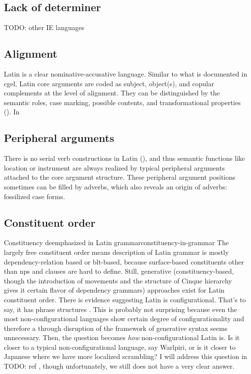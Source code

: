 \documentclass[a4paper, oneside]{report}
\begin{document}
\subsection{Lack of determiner}

TODO: other IE languages

\subsection{Alignment}

Latin is a clear nominative-accusative language.
Similar to what is documented in \acs{cgel},
Latin core arguments are coded as subject, object(s),
and copular complements at the level of alignment.
They can be distinguished by the semantic roles,
case marking, possible contents, and transformational properties 
().
In 

\subsection{Peripheral arguments}

There is no serial verb constructions in Latin (),
and thus semantic functions like location or instrument 
are always realized by typical peripheral arguments
attached to the core argument structure.
These peripheral argument positions sometimes can be filled by adverbs,
which also reveals an origin of adverbs: fossilized case forms.

\subsection{Constituent order}\label{sec:constituent-order-abs}

\begin{theorybox}{Constituency deemphasized in Latin grammar}{constituency-in-grammar}
    The largely free constituent order 
    means description of Latin grammar is mostly dependency-relation based or \acs{blt}-based,
    because surface-based constituents other than \acs{np}s and clauses are hard to define.
    Still, generative (constituency-based, 
    though the introduction of movements and the structure of Cinque hierarchy
    gives it certain flavor of dependency grammars) approaches exist for Latin constituent order.
    There is evidence suggesting Latin is configurational.
    That's to say, it has phrase structures \citep{danckaert2017development}.
    This is probably not surprising because
    even the most non-configurational languages show certain degree of configurationality 
    \citep[among others]{niedzielski2017clausal,morris2018evidence,legate2002warlpiri}
    and therefore a through disruption 
    of the framework of generative syntax seems unnecessary.
    Then, the question becomes \emph{how} non-configurational Latin is.
    Is it closer to a typical non-configurational language, say Warlpiri, 
    or is it closer to Japanese where we have more localized scrambling?
    I will address this question in TODO: ref ,
    though unfortunately, we still does not have a very clear answer.
\end{theorybox}
\end{document}
